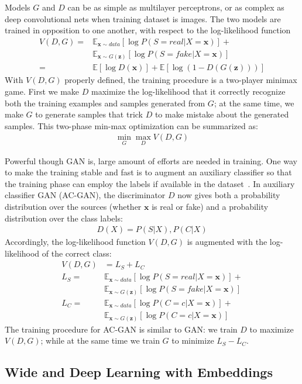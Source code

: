 Models $G$ and $D$ can be as simple as multilayer perceptrons,
or as complex as deep convolutional nets when training dataset is images.
The two models are trained in opposition to one another, with respect to the log-likelihood
function
\begin{equation}
\begin{aligned}
V(D, G) = & \mathbb{E}_{\bm{x}\sim data} [\log P(S=real|X=\bm{x})] + \\
          & \mathbb{E}_{\bm{x}\sim G(\bm{z})} [\log P(S=fake|X=\bm{x})] \\
        = & \mathbb{E}[\log D(\bm{x})] + \mathbb{E}[\log (1 - D(G(\bm{z})))]
\end{aligned}
\end{equation}
With $V(D, G)$ properly defined, the training procedure is a two-player minimax game.
First we make $D$ maximize the log-likelihood that it correctly recognize
both the training examples and samples generated from $G$;
at the same time, we make $G$ to generate samples that trick $D$ to make mistake about the
generated samples.
This two-phase min-max optimization can be summarized as:
\begin{align}
    \min_G \max_D V(D, G)
\end{align}

Powerful though GAN is, large amount of efforts are needed in training.
One way to make the training stable and fast is to augment an auxiliary classifier so that
the training phase can employ the labels if available in the dataset~\cite{AC-GAN}.
In auxiliary classifier GAN (AC-GAN), the discriminator $D$ now gives both a probability
distribution over the sources (whether $\bm{x}$ is real or fake) and a probability distribution
over the class labels:
\begin{align}
    D(X) = P(S|X), P(C|X)
\end{align}
Accordingly, the log-likelihood function $V(D, G)$ is augmented with the log-likelihood of the correct class:
\begin{equation}
\begin{aligned} 
    V(D, G) &= L_S + L_C \\
    L_S = & \mathbb{E}_{\bm{x} \sim data} [\log P(S=real|X=\bm{x})] + \\
          & \mathbb{E}_{\bm{x} \sim G(\bm{z})} [\log P(S=fake|X=\bm{x})] \\
    L_C = & \mathbb{E}_{\bm{x} \sim data}[\log P(C=c|X=\bm{x})] + \\
          & \mathbb{E}_{\bm{x} \sim G(\bm{z})} [\log P(C=c|X=\bm{x})]
\end{aligned}
\end{equation}
The training procedure for AC-GAN is similar to GAN: we train $D$ to maximize $V(D, G)$;
while at the same time we train $G$ to minimize $L_S - L_C$.


\subsection{Wide and Deep Learning with Embeddings}





